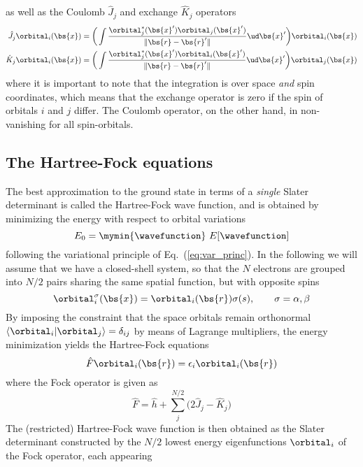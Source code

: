 as well as the Coulomb $\hat{J}_j$ and exchange $\hat{K}_j$ operators
\begin{align}
    \hat{J}_j \orbital_i(\bs{x}) &= \bigg(\int \frac{\orbital_j^{\ast}(\bs{x}')\orbital_j(\bs{x}')}
	{\|\bs{r}-\bs{r}'\|}\ud\bs{x}'\bigg) \orbital_i(\bs{x})\\
    \hat{K}_j \orbital_i(\bs{x}) &= \bigg(\int \frac{\orbital_j^{\ast}(\bs{x}')\orbital_i(\bs{x}')}
	{\|\bs{r}-\bs{r}'\|}\ud\bs{x}'\bigg) \orbital_j(\bs{x})
\end{align}
where it is important to note that the integration is over space \emph{and} spin coordinates,
which means that the exchange operator is zero if the spin of orbitals $i$ and $j$ differ. 
The Coulomb operator, on the other hand, in non-vanishing for all spin-orbitals.

\subsection{The Hartree-Fock equations}
The best approximation to the ground state in terms of a \emph{single} Slater determinant is 
called the Hartree-Fock wave function, and is obtained by minimizing the energy with respect 
to orbital variations
\begin{equation}
    E_0 = \mymin{\wavefunction}\ E[\wavefunction]
\end{equation}
following the variational principle of Eq.~(\ref{eq:var_princ}). 
In the following we will assume that we have a closed-shell system, so that the $N$ electrons
are grouped into $N/2$ pairs sharing the same spatial function, but with opposite spins
\begin{equation}
    \orbital_i^\sigma(\bs{x}) = \orbital_i(\bs{r})\sigma(s), \qquad \sigma = \alpha,\beta
\end{equation}
By imposing the constraint 
that the space orbitals remain orthonormal $\langle\orbital_i|\orbital_j\rangle = \delta_{ij}$
by means of Lagrange multipliers, the energy minimization yields the Hartree-Fock equations
\begin{equation}
    \hat{F}\orbital_i(\bs{r}) = \epsilon_i \orbital_i(\bs{r})
\end{equation}
where the Fock operator is given as
\begin{equation}
    \hat{F} = \hat{h} + \sum_j^{N/2} \Big(2\hat{J}_j - \hat{K}_j\Big)
\end{equation}
The (restricted) Hartree-Fock wave function is then obtained as the Slater determinant constructed 
by the $N/2$ lowest energy eigenfunctions $\orbital_i$ of the Fock operator, each appearing 
